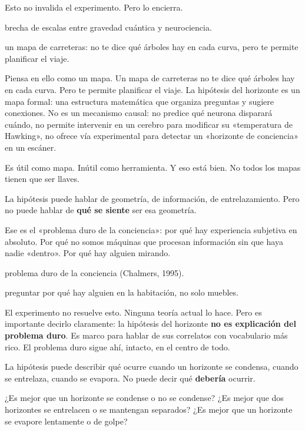 Esto no invalida el experimento. Pero lo encierra.

\begin{fisica}
 brecha de escalas entre gravedad cuántica y neurociencia.

 un mapa de carreteras: no te dice qué árboles hay en cada curva, pero te permite planificar el viaje.
\end{fisica}
Piensa en ello como un mapa. Un mapa de carreteras no te dice qué árboles hay en cada curva. Pero te permite planificar el viaje. La hipótesis del horizonte es un mapa formal: una estructura matemática que organiza preguntas y sugiere conexiones. No es un mecanismo causal: no predice qué neurona disparará cuándo, no permite intervenir en un cerebro para modificar su «temperatura de Hawking», no ofrece vía experimental para detectar un «horizonte de conciencia» en un escáner.

Es útil como mapa. Inútil como herramienta. Y eso está bien. No todos los mapas tienen que ser llaves.

\noindent La hipótesis puede hablar de geometría, de información, de entrelazamiento. Pero no puede hablar de \textbf{qué se siente} ser esa geometría.

Ese es el «problema duro de la conciencia»: por qué hay experiencia subjetiva en absoluto. Por qué no somos máquinas que procesan información sin que haya nadie «dentro». Por qué hay alguien mirando.

\begin{fisica}
 problema duro de la conciencia (Chalmers, 1995).

 preguntar por qué hay alguien en la habitación, no solo muebles.
\end{fisica}
El experimento no resuelve esto. Ninguna teoría actual lo hace. Pero es importante decirlo claramente: la hipótesis del horizonte \textbf{no es explicación del problema duro}. Es marco para hablar de sus correlatos con vocabulario más rico. El problema duro sigue ahí, intacto, en el centro de todo.

\noindent La hipótesis puede describir qué ocurre cuando un horizonte se condensa, cuando se entrelaza, cuando se evapora. No puede decir qué \textbf{debería} ocurrir.

¿Es mejor que un horizonte se condense o no se condense? ¿Es mejor que dos horizontes se entrelacen o se mantengan separados? ¿Es mejor que un horizonte se evapore lentamente o de golpe?

